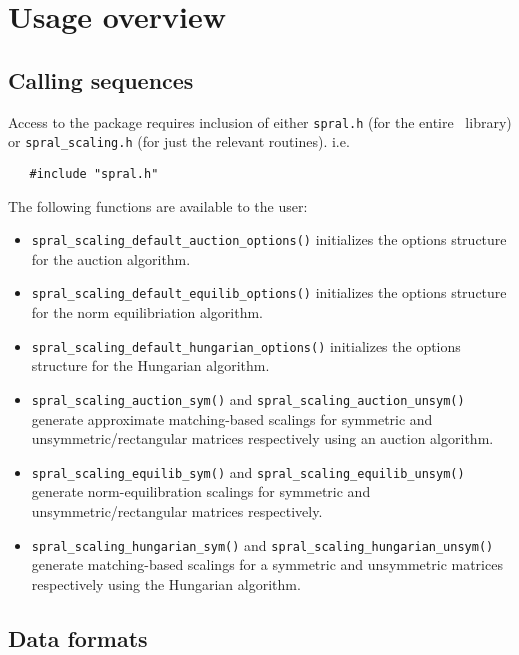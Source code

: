 
\section{Usage overview}

\subsection{Calling sequences}

Access to the package requires inclusion of either \texttt{spral.h} (for the
entire \spral\ library) or \texttt{spral\_scaling.h} (for just the relevant routines). i.e.

\begin{verbatim}
   #include "spral.h"
\end{verbatim}

\newpage
\noindent
The following functions are available to the user:
\begin{itemize}
\item {\tt spral\_scaling\_default\_auction\_options()} initializes the options structure for the auction algorithm.
\item {\tt spral\_scaling\_default\_equilib\_options()} initializes the options structure for the norm equilibriation algorithm.
\item {\tt spral\_scaling\_default\_hungarian\_options()} initializes the options structure for the Hungarian algorithm.
\item {\tt spral\_scaling\_auction\_sym()} and \texttt{spral\_scaling\_auction\_unsym()} generate approximate matching-based scalings for symmetric and unsymmetric/rectangular matrices respectively using an auction algorithm.
\item {\tt spral\_scaling\_equilib\_sym()} and \texttt{spral\_scaling\_equilib\_unsym()} generate norm-equilibration scalings for symmetric and unsymmetric/rectangular matrices respectively.
\item {\tt spral\_scaling\_hungarian\_sym()} and \texttt{spral\_scaling\_hungarian\_unsym()} generate matching-based scalings for a symmetric and unsymmetric matrices respectively using the Hungarian algorithm.
\end{itemize}

\subsection{Data formats} \label{dataformats}

